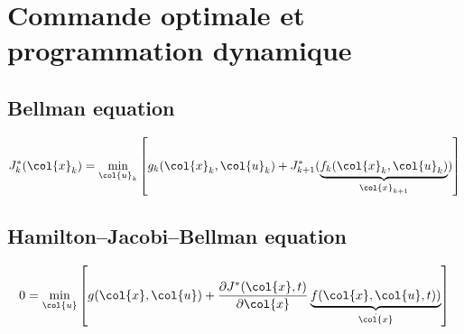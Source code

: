 \chapter{Commande optimale et programmation dynamique}


\section{Bellman equation}

\begin{align}
J^*_k(\col{x}_k) = 
\operatornamewithlimits{min}\limits_{\col{u}_k}
\left[
g_k(\col{x}_k , \col{u}_k ) + J^*_{k+1}( 
\underbrace{
f_k(\col{x}_k , \col{u}_k ) 
}_{\col{x}_{k+1}}
)
\right]
\label{eq:bellamn}
\end{align} 

\section{Hamilton–Jacobi–Bellman equation}

\begin{align}
0 =
\operatornamewithlimits{min}\limits_{\col{u}}
\left[
g(\col{x} , \col{u} ) + \frac{\partial	J^*(\col{x},t)}{\partial \col{x} }
\underbrace{
f(\col{x} , \col{u} , t) )
}_{\dot{\col{x}}}
\right]
\label{eq:hjb}
\end{align} 
